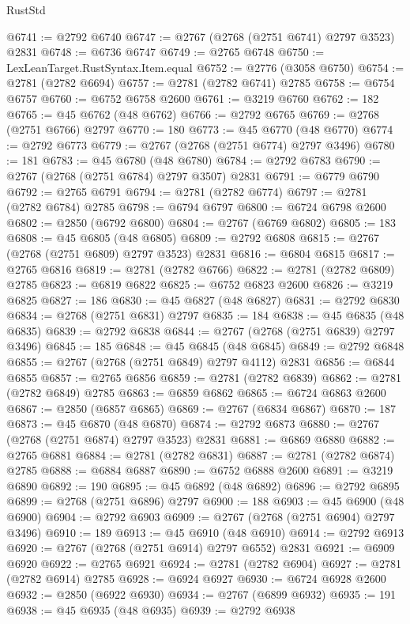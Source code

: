 \begin{lexlean}{RustStd}
\begin{coremodule}
@6741 := @2792 @6740
@6747 := @2767 (@2768 (@2751 @6741) @2797 @3523) @2831
@6748 := @6736 @6747
@6749 := @2765 @6748
@6750 := LexLeanTarget.RustSyntax.Item.equal
@6752 := @2776 (@3058 @6750)
@6754 := @2781 (@2782 @6694)
@6757 := @2781 (@2782 @6741) @2785
@6758 := @6754 @6757
@6760 := @6752 @6758 @2600
@6761 := @3219 @6760
@6762 := 182
@6765 := @45 @6762 (@48 @6762)
@6766 := @2792 @6765
@6769 := @2768 (@2751 @6766) @2797
@6770 := 180
@6773 := @45 @6770 (@48 @6770)
@6774 := @2792 @6773
@6779 := @2767 (@2768 (@2751 @6774) @2797 @3496)
@6780 := 181
@6783 := @45 @6780 (@48 @6780)
@6784 := @2792 @6783
@6790 := @2767 (@2768 (@2751 @6784) @2797 @3507) @2831
@6791 := @6779 @6790
@6792 := @2765 @6791
@6794 := @2781 (@2782 @6774)
@6797 := @2781 (@2782 @6784) @2785
@6798 := @6794 @6797
@6800 := @6724 @6798 @2600
@6802 := @2850 (@6792 @6800)
@6804 := @2767 (@6769 @6802)
@6805 := 183
@6808 := @45 @6805 (@48 @6805)
@6809 := @2792 @6808
@6815 := @2767 (@2768 (@2751 @6809) @2797 @3523) @2831
@6816 := @6804 @6815
@6817 := @2765 @6816
@6819 := @2781 (@2782 @6766)
@6822 := @2781 (@2782 @6809) @2785
@6823 := @6819 @6822
@6825 := @6752 @6823 @2600
@6826 := @3219 @6825
@6827 := 186
@6830 := @45 @6827 (@48 @6827)
@6831 := @2792 @6830
@6834 := @2768 (@2751 @6831) @2797
@6835 := 184
@6838 := @45 @6835 (@48 @6835)
@6839 := @2792 @6838
@6844 := @2767 (@2768 (@2751 @6839) @2797 @3496)
@6845 := 185
@6848 := @45 @6845 (@48 @6845)
@6849 := @2792 @6848
@6855 := @2767 (@2768 (@2751 @6849) @2797 @4112) @2831
@6856 := @6844 @6855
@6857 := @2765 @6856
@6859 := @2781 (@2782 @6839)
@6862 := @2781 (@2782 @6849) @2785
@6863 := @6859 @6862
@6865 := @6724 @6863 @2600
@6867 := @2850 (@6857 @6865)
@6869 := @2767 (@6834 @6867)
@6870 := 187
@6873 := @45 @6870 (@48 @6870)
@6874 := @2792 @6873
@6880 := @2767 (@2768 (@2751 @6874) @2797 @3523) @2831
@6881 := @6869 @6880
@6882 := @2765 @6881
@6884 := @2781 (@2782 @6831)
@6887 := @2781 (@2782 @6874) @2785
@6888 := @6884 @6887
@6890 := @6752 @6888 @2600
@6891 := @3219 @6890
@6892 := 190
@6895 := @45 @6892 (@48 @6892)
@6896 := @2792 @6895
@6899 := @2768 (@2751 @6896) @2797
@6900 := 188
@6903 := @45 @6900 (@48 @6900)
@6904 := @2792 @6903
@6909 := @2767 (@2768 (@2751 @6904) @2797 @3496)
@6910 := 189
@6913 := @45 @6910 (@48 @6910)
@6914 := @2792 @6913
@6920 := @2767 (@2768 (@2751 @6914) @2797 @6552) @2831
@6921 := @6909 @6920
@6922 := @2765 @6921
@6924 := @2781 (@2782 @6904)
@6927 := @2781 (@2782 @6914) @2785
@6928 := @6924 @6927
@6930 := @6724 @6928 @2600
@6932 := @2850 (@6922 @6930)
@6934 := @2767 (@6899 @6932)
@6935 := 191
@6938 := @45 @6935 (@48 @6935)
@6939 := @2792 @6938

\end{coremodule}
\end{lexlean}
